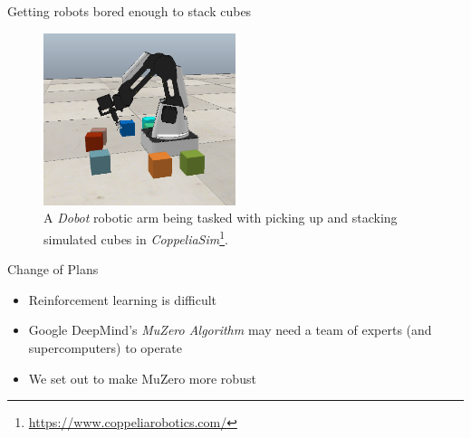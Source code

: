 \begin{frame}{Getting robots bored enough to stack cubes}
    \begin{figure}
        \centering
        \includegraphics[width=0.5\textwidth]{assets/cube_stacking.png}
        \caption{A \textit{Dobot} robotic arm being tasked with picking up and stacking simulated cubes in \textit{CoppeliaSim}\footnote{\url{https://www.coppeliarobotics.com/}}.}
        \label{fig:cube_stacking}
    \end{figure}
\end{frame}

\begin{frame}{Change of Plans}
    \begin{itemize}
        \item Reinforcement learning is difficult
        \item Google DeepMind's \textit{MuZero Algorithm} \cite{muzero} may need a team of experts (and supercomputers) to operate
        \item We set out to make MuZero more robust
    \end{itemize}
\end{frame}
